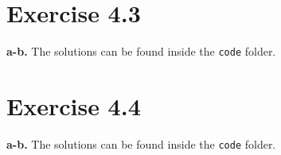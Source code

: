 \documentclass[12pt]{article}
\begin{document}
	\section*{Exercise 4.3}
	\textbf{a-b.} The solutions can be found inside the \texttt{code} folder.
	\section*{Exercise 4.4}
	\textbf{a-b.} The solutions can be found inside the \texttt{code} folder.
\end{document}

